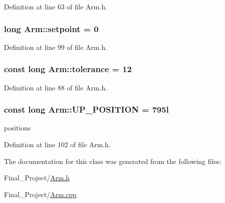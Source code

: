 Definition at line 63 of file Arm.\-h.

\hypertarget{classArm_aa168ca685ff8170699ca535590c2af14}{
\subsubsection[{setpoint}]{\setlength{\rightskip}{0pt plus 5cm}long Arm\-::setpoint = 0\hspace{0.3cm}{\ttfamily [private]}}}\label{classArm_aa168ca685ff8170699ca535590c2af14}


Definition at line 99 of file Arm.\-h.

\hypertarget{classArm_afb4e56fd59b92d0b4c157c0ea7fe9db8}{
\subsubsection[{tolerance}]{\setlength{\rightskip}{0pt plus 5cm}const long Arm\-::tolerance = 12\hspace{0.3cm}{\ttfamily [private]}}}\label{classArm_afb4e56fd59b92d0b4c157c0ea7fe9db8}


Definition at line 88 of file Arm.\-h.

\hypertarget{classArm_a44fed3661f22f9acd7f3cd8635a4fc6a}{
\subsubsection[{U\-P\-\_\-\-P\-O\-S\-I\-T\-I\-O\-N}]{\setlength{\rightskip}{0pt plus 5cm}const long Arm\-::\-U\-P\-\_\-\-P\-O\-S\-I\-T\-I\-O\-N = 795l\hspace{0.3cm}{\ttfamily [private]}}}\label{classArm_a44fed3661f22f9acd7f3cd8635a4fc6a}
positions 

Definition at line 102 of file Arm.\-h.



The documentation for this class was generated from the following files\-:\begin{DoxyCompactItemize}
\item 
Final\-\_\-\-Project/\hyperlink{Arm_8h}{Arm.\-h}\item 
Final\-\_\-\-Project/\hyperlink{Arm_8cpp}{Arm.\-cpp}\end{DoxyCompactItemize}
